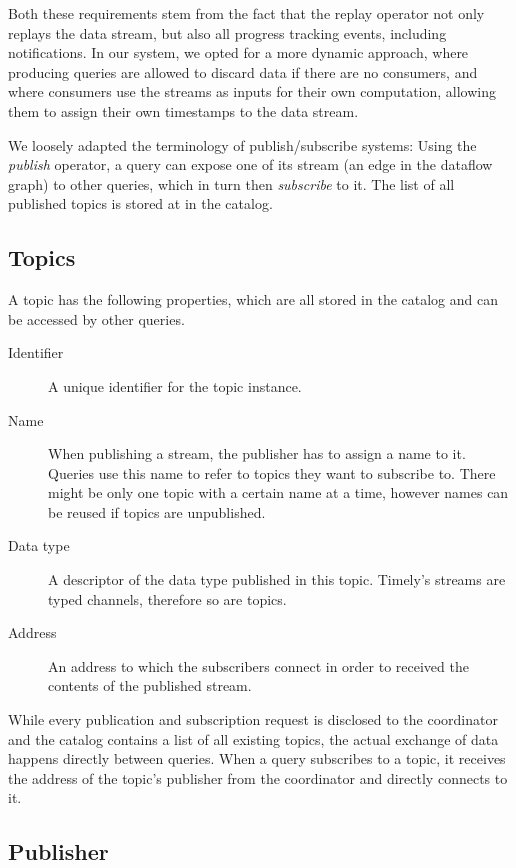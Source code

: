 Both these requirements stem from the fact that the replay operator not only
replays the data stream, but also all progress tracking events, including
notifications. In our system, we opted for a more dynamic approach, where
producing queries are allowed to discard data if there are no consumers, and
where consumers use the streams as inputs for their own computation,
allowing them to assign their own timestamps to the data stream.

We loosely adapted the terminology of publish/subscribe systems: Using the
\emph{publish} operator, a query can expose one of its stream
(an edge in the dataflow graph) to other queries, which in turn then \emph{subscribe}
to it. The list of all published topics is stored at in the catalog.

\subsection{Topics}

A topic has the following properties, which are all stored in the catalog
and can be accessed by other queries.
\begin{description}
\item [Identifier] A unique identifier for the topic instance.
\item [Name] When publishing a stream, the publisher has to assign a name to it.
Queries use this name to refer to topics they want to subscribe to. There might
be only one topic with a certain name at a time, however names can be reused if
topics are unpublished.
\item [Data type] A descriptor of the data type published in this topic. Timely's
streams are typed channels, therefore so are topics.
\item [Address] An address to which the subscribers connect in order to received
the contents of the published stream.
\end{description}

While every publication and subscription request is disclosed to the coordinator
and the catalog contains a list of all existing topics, the
actual exchange of data happens directly between queries. When a query subscribes
to a topic, it receives the address of the topic's publisher from the coordinator
and directly connects to it.

\subsection{Publisher}

